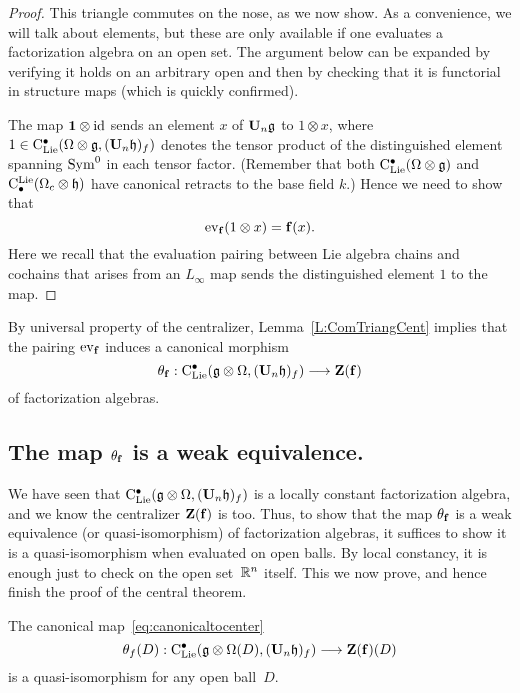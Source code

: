\documentclass[11pt]{amsart}
\numberwithin{equation}{section}
\begin{document}
\begin{proof}
This triangle commutes on the nose, as we now show.
As a convenience, we will talk about elements, but these are only available if one evaluates a factorization algebra on an open set.
The argument below can be expanded by verifying it holds on an arbitrary open and then by checking that it is functorial in structure maps (which is quickly confirmed).

The map $\mathbf{1} \otimes {\rm id}$ sends an element $x$ of $\mathbf U_n \mathfrak g$ to $1 \otimes x$,
where $1 \in {\rm C}_{\rm Lie}^\bullet ( \Omega \otimes \mathfrak g , (\mathbf U_n \mathfrak h)_f)$ denotes the tensor product of the distinguished element spanning ${\rm Sym}^0$ in each tensor factor.
(Remember that both ${\rm C}_{\rm Lie}^\bullet(\Omega \otimes \mathfrak g)$ and ${\rm C}^{\rm Lie}_\bullet(\Omega_c \otimes \mathfrak h)$ have canonical retracts to the base field $k$.)
Hence we need to show that
\[
{\rm ev}_{{\bf f}}(1 \otimes x) = {\bf f}(x).
\]
Here we recall that the evaluation pairing between Lie algebra chains and cochains that arises from an $L_\infty$ map sends the distinguished element $1$ to the map.
\end{proof}

By universal property of the centralizer, 
Lemma~\ref{L:ComTriangCent} implies that the pairing ${\rm ev}_{{\bf f}}$ induces a canonical morphism 
\begin{equation}
\label{eq:canonicaltocenter}
\theta_{{\bf f}}: {\rm C}_{\rm Lie}^\bullet(\mathfrak g\otimes \Omega , (\mathbf U_n \mathfrak h)_f ) \longrightarrow  {\mathbf Z}(\mathbf{f})
\end{equation}
of factorization algebras.


\subsection{The map $\theta_{{\bf f}}$ is a weak equivalence.} 

We have seen that ${\rm C}_{\rm Lie}^\bullet(\mathfrak g\otimes \Omega , (\mathbf U_n \mathfrak h )_f)$ is a locally constant factorization algebra,
and we know the centralizer $\mathbf Z({\bf f})$ is too.
Thus, to show that the map $\theta_{{\bf f}}$ is a weak equivalence (or quasi-isomorphism) of factorization algebras,
it suffices to show it is a quasi-isomorphism when evaluated on open balls.
By local constancy, it is enough just to check on the open set~$\mathbb R^n$ itself.
This we now prove, and hence finish the proof of the central theorem.

\begin{lmm}
\label{L:thetaquisondisk}
The canonical map~\eqref{eq:canonicaltocenter}
\[
\theta_f(D): {\rm C}_{\rm Lie}^\bullet(\mathfrak g\otimes \Omega (D),  (\mathbf U_n \mathfrak h)_f) \longrightarrow \mathbf Z(\mathbf{f})(D)
\] 
 is a quasi-isomorphism for any open ball~$D$.
\end{lmm}
\end{document}
